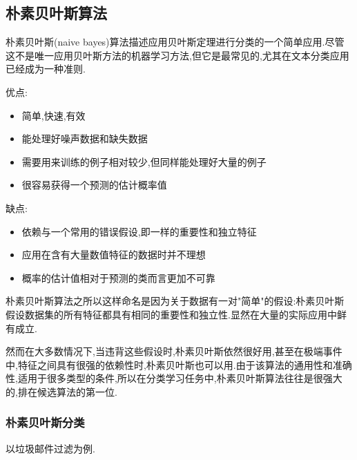 \documentclass[11pt,a4paper,oneside]{book}
\begin{document}
\subsection{朴素贝叶斯算法}
朴素贝叶斯(naive bayes)算法描述应用贝叶斯定理进行分类的一个简单应用.尽管这不是唯一应用贝叶斯方法的机器学习方法,但它是最常见的,尤其在文本分类应用已经成为一种准则.
\begin{tcolorbox}[colback=pink!10!white,colframe=pink!100!black]
优点:
\begin{itemize}
	\item 简单,快速,有效
	\item 能处理好噪声数据和缺失数据
	\item 需要用来训练的例子相对较少,但同样能处理好大量的例子
	\item 很容易获得一个预测的估计概率值
\end{itemize}
缺点:
\begin{itemize}
	\item 依赖与一个常用的错误假设,即一样的重要性和独立特征
	\item 应用在含有大量数值特征的数据时并不理想
	\item 概率的估计值相对于预测的类而言更加不可靠
\end{itemize}
\end{tcolorbox}
朴素贝叶斯算法之所以这样命名是因为关于数据有一对"简单"的假设:朴素贝叶斯假设数据集的所有特征都具有相同的重要性和独立性.显然在大量的实际应用中鲜有成立.

然而在大多数情况下,当违背这些假设时,朴素贝叶斯依然很好用,甚至在极端事件中,特征之间具有很强的依赖性时,朴素贝叶斯也可以用.由于该算法的通用性和准确性,适用于很多类型的条件,所以在分类学习任务中,朴素贝叶斯算法往往是很强大的,排在候选算法的第一位.
\subsubsection{朴素贝叶斯分类}
以垃圾邮件过滤为例.
\end{document}
